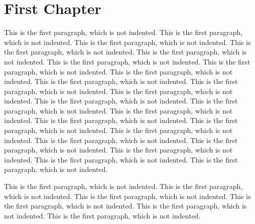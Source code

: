 \documentclass[11pt,a4paper,english]{book}
\begin{document}
\chapter{First Chapter}
\chaptername \thechapter
This is the first paragraph, which is not indented.
This is the first paragraph, which is not indented.
This is the first paragraph, which is not indented.
This is the first paragraph, which is not indented.
This is the first paragraph, which is not indented.
This is the first paragraph, which is not indented.
This is the first paragraph, which is not indented.
This is the first paragraph, which is not indented.
This is the first paragraph, which is not indented.
This is the first paragraph, which is not indented.
This is the first paragraph, which is not indented.
This is the first paragraph, which is not indented.
This is the first paragraph, which is not indented.
This is the first paragraph, which is not indented.
This is the first paragraph, which is not indented.
This is the first paragraph, which is not indented.
This is the first paragraph, which is not indented.
This is the first paragraph, which is not indented.
This is the first paragraph, which is not indented.
This is the first paragraph, which is not indented.
This is the first paragraph, which is not indented.
This is the first paragraph, which is not indented.

This is the first paragraph, which is not indented.
This is the first paragraph, which is not indented.
This is the first paragraph, which is not indented.
This is the first paragraph, which is not indented.
This is the first paragraph, which is not indented.
This is the first paragraph, which is not indented.
\end{document}
